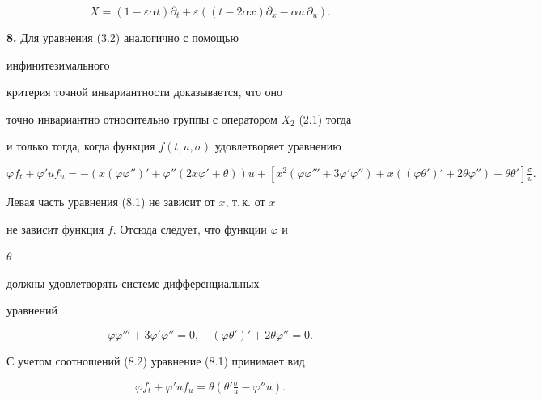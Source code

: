 \begin{equation} 


X=(1-\varepsilon\alpha t)\partial _t+\varepsilon 


((t-2\alpha x)\partial _x-\alpha u\,\partial _u).\tag{7.10} 


\end{equation} 


 


{\bf 8.} Для уравнения (3.2) аналогично с помощью 


инфинитезимального 


критерия точной инвариантности доказывается, что оно 


точно инвариантно относительно группы с оператором $X_2$ (2.1) тогда 


и только тогда, когда функция $f(t,u,\sigma)$ удовлетворяет уравнению 


\begin{equation} 


\varphi f_t{+}\varphi'u f_u=-(x(\varphi\varphi'')'{+} 


\varphi''(2x\varphi'{+}\theta))u{+} 


[x^2(\varphi\varphi'''+3\varphi'\varphi'')+x 


((\varphi\theta')'+2\theta\varphi'')+\theta\theta'] 


\tfrac{\sigma}{u}. \tag{8.1} 


\end{equation} 


 


Левая часть уравнения (8.1) не зависит от $x$, т.\,к. от $x$ 


не зависит функция $f$. Отсюда следует, что функции $\varphi$ и 


$\theta$ 


должны удовлетворять системе дифференциальных 


уравнений 


\begin{equation} 


\varphi\varphi'''+3\varphi'\varphi''=0,\quad 


(\varphi\theta')'+2\theta\varphi''=0. \tag{8.2} 


\end{equation} 


С учетом соотношений (8.2) уравнение (8.1) принимает вид 


\begin{equation} 


\varphi f_t+\varphi'u f_u=\theta 


(\theta'\tfrac{\sigma}{u}-\varphi''u).\tag{8.3} 


\end{equation} 


